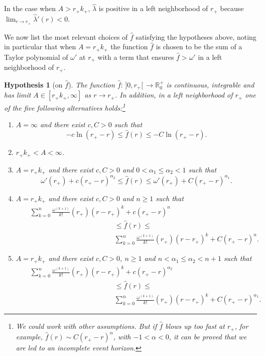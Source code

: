 \documentclass[a4paper,11pt,oneside,reqno]{amsart}
\newcommand{\kk}{k_+}
\newtheorem{Hyp}[Thm]{Hypothesis}
\newcommand{\R}{\mathbb{R}}
\begin{document}
In the case when $A>r_+\kk$,
 $\hat\lambda$ is positive in a left neighborhood of $r_+$ because
 $\lim_{r\to r_+}\hat\lambda'(r)<0$.
 

We now list the most relevant choices of $\hat f$ satisfying the hypotheses above, noting in particular that when $A=r_+\kk$ the function $\hat{f}$ is chosen to be the sum of a Taylor polynomial of $\omega'$ at $r_+$ with a term that ensures $\hat{f}>\omega'$ in a left neighborhood of $r_+$.

\begin{Hyp}[on $\hat f$]\label{hyp}
The function $\hat{f}:\,]0,r_+[\,\to\R^+_0$ is continuous, integrable and has
limit $A\in\left[r_+\kk,\infty\right]$ as $r \to r_+$.
In addition, in a left neighborhood of $r_+$ one of the five following alternatives holds:\footnote{We could work with other assumptions. 
But if $\hat{f}$ blows up too fast at $r_+$, for example,
$\hat{f}(r)\sim C(r_+-r)^\alpha$, with $-1<\alpha<0$, it can be proved that we are
led to an incomplete event horizon.}
\begin{enumerate}[{\rm (i)}]
\item $A=\infty$ and there exist $c,C>0$ such that
$$
-c\ln(r_+-r)\leq\hat{f}(r)\leq -C\ln(r_+-r).
$$
\item $r_+\kk<A<\infty$.
\item $A=r_+\kk$ and
there exist $c,C>0$ and $0<\alpha_1\leq\alpha_2<1$ such that
$$
\omega'(r_+)+c(r_+-r)^{\alpha_2}\leq
\hat{f}(r)\leq\omega'(r_+)+C(r_+-r)^{\alpha_1}.
$$
\item $A=r_+\kk$ and
there exist $c,C>0$ and $n\geq 1$ such that
\begin{eqnarray*}
&&\sum_{k=0}^n\frac{\omega^{(k+1)}}{k!}(r_+)(r-r_+)^k+c(r_+-r)^{n}\\
&&\qquad\qquad\qquad\qquad\qquad\qquad\leq\hat{f}(r)\leq\\
&&\qquad\qquad\qquad\qquad\qquad\qquad\sum_{k=0}^n
\frac{\omega^{(k+1)}}{k!}(r_+)(r-r_+)^k+C(r_+-r)^{n}.
\end{eqnarray*}
\item $A=r_+\kk$ and
there exist $c,C>0$, $n\geq 1$ and $n<\alpha_1\leq\alpha_2<n+1$ such that
\begin{eqnarray*}
&&\sum_{k=0}^n\frac{\omega^{(k+1)}}{k!}(r_+)(r-r_+)^k+c(r_+-r)^{\alpha_2}\\
&&\qquad\qquad\qquad\qquad\qquad\qquad\leq\hat{f}(r)\leq\\
&&\qquad\qquad\qquad\qquad\qquad\qquad\sum_{k=0}^n\frac{\omega^{(k+1)}}{k!}(r_+)(r-r_+)^k+C(r_+-r)^{\alpha_1}.
\end{eqnarray*}
\end{enumerate}
\end{Hyp}
\end{document}
